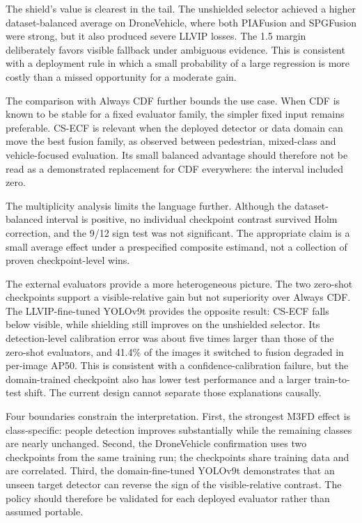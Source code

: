 \documentclass[preprint,11pt]{elsarticle}
\begin{document}
The shield's value is clearest in the tail. The unshielded selector achieved a
higher dataset-balanced average on DroneVehicle, where both PIAFusion and
SPGFusion were strong, but it also produced severe LLVIP losses. The 1.5 margin
deliberately favors visible fallback under ambiguous evidence. This is
consistent with a deployment rule in which a small probability of a large
regression is more costly than a missed opportunity for a moderate gain.

The comparison with Always CDF further bounds the use case. When CDF is known
to be stable for a fixed evaluator family, the simpler fixed input remains
preferable. CS-ECF is relevant when the deployed detector or data domain can
move the best fusion family, as observed between pedestrian, mixed-class and
vehicle-focused evaluation. Its small balanced advantage should therefore not
be read as a demonstrated replacement for CDF everywhere: the interval
included zero.

The multiplicity analysis limits the language further. Although the
dataset-balanced interval is positive, no individual checkpoint contrast
survived Holm correction, and the 9/12 sign test was not significant. The
appropriate claim is a small average effect under a prespecified composite
estimand, not a collection of proven checkpoint-level wins.

The external evaluators provide a more heterogeneous picture. The two zero-shot
checkpoints support a visible-relative gain but not superiority over Always CDF.
The LLVIP-fine-tuned YOLOv9t provides the opposite result: CS-ECF falls below
visible, while shielding still improves on the unshielded selector. Its
detection-level calibration error was about five times larger than those of
the zero-shot evaluators, and 41.4\% of the images it switched to fusion
degraded in per-image AP50. This is consistent with a confidence-calibration
failure, but the domain-trained checkpoint also has lower test performance and
a larger train-to-test shift. The current design cannot separate those
explanations causally.

Four boundaries constrain the interpretation. First, the strongest M3FD effect
is class-specific: people detection improves substantially while the remaining
classes are nearly unchanged. Second, the DroneVehicle confirmation uses two
checkpoints from the same training run; the checkpoints share training data and
are correlated. Third, the domain-fine-tuned YOLOv9t demonstrates that an
unseen target detector can reverse the sign of the visible-relative contrast.
The policy should therefore be validated for each deployed evaluator rather
than assumed portable.
\end{document}
